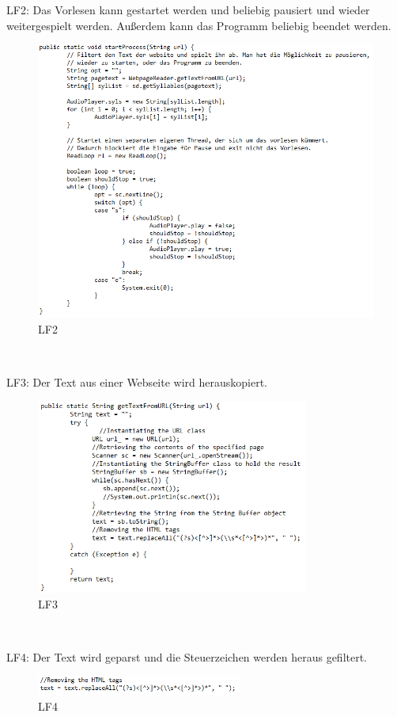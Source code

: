 \documentclass[12pt]{scrartcl}
\begin{document}
\newpage

LF2: Das Vorlesen kann gestartet werden und beliebig pausiert und wieder weitergespielt werden. Außerdem kann das Programm beliebig beendet werden.
\begin{figure}[hp!]
 \centering
 \includegraphics[width=1.0\textwidth]{res/LF2}
 \caption{LF2}
 \label{fig: fig2}
\end{figure}
~

\newpage

LF3: Der Text aus einer Webseite wird herauskopiert.
\begin{figure}[hp!]
 \centering
 \includegraphics[width=0.8\textwidth]{res/LF3}
 \caption{LF3}
 \label{fig: fig3}
\end{figure}
~

\newpage

LF4: Der Text wird geparst und die Steuerzeichen werden heraus gefiltert.
\begin{figure}[hp!]
 \centering
 \includegraphics[width=0.6\textwidth]{res/LF4}
 \caption{LF4}
 \label{fig: fig4}
\end{figure}
~
\end{document}

